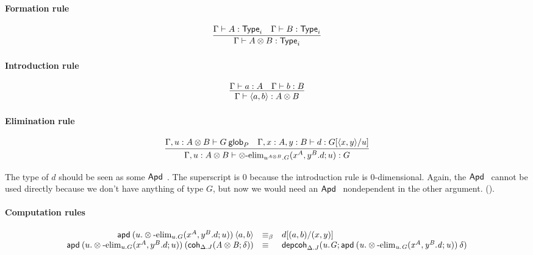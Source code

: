 \paragraph{Formation rule}

\begin{small}
  \[
  \infer{\wftype\Gamma{A\otimes B}} {\wftype\Gamma{A} & \wftype\Gamma{B}}
  \]
\end{small}

\paragraph{Introduction rule}

\begin{small}
  \[
  \infer{\ofglob{\Gamma}{\langle a, b\rangle}{A\otimes B}}
  {\ofglob{\Gamma}{a}{A}
    & \ofglob{\Gamma}{b}{B}}
  \]
\end{small}

\paragraph{Elimination rule}

\begin{small}
  \[
  \infer{\ofglob{\Gamma,u:A\otimes B}{\otimes\text{-elim}_{u^{A\otimes B}.G}
      {(x^A,y^B.d;u)}}{G}}
  {\wfglob{\Gamma,u:A\otimes B}{G}{m}{P}
    & \ofglob{\Gamma,x:A,y:B}{d}{G[\langle x,y\rangle/u]}}
  \]
\end{small}

The type of $d$ should be seen as some $\mathsf{Apd} \: {} \: {}$. The superscript is
$0$ because the introduction rule is $0$-dimensional. Again, the
$\mathsf{Apd} \: {} \: {}$ cannot be used directly because we don’t have anything of
type $G$, but now we would need an $\mathsf{Apd} \: {} \: {}$ nondependent in the other
argument. ().

\paragraph{Computation rules}

\begin{small}
  \[
  \begin{array}{rll}
    \mathsf{apd} \: {(u.\otimes\text{-elim}_{u.G}
      {(x^A,y^B.d;u)})} \: {\langle a,b\rangle} & \equiv_\beta & d[(a,b)/(x,y)] \\
    \mathsf{apd} \: {(u.\otimes\text{-elim}_{u.G}
      {(x^A,y^B.d;u)})} \: {(\mathsf{coh}_{\Delta.J} \mathit{(A\otimes B;\delta)})} & \equiv &
    \mathsf{depcoh}_{\Delta.J} \mathit{(u.G;\mathsf{apd} \: {(u.\otimes\text{-elim}_{u.G}
      {(x^A,y^B.d;u)})} \: {\delta})}
  \end{array}
  \]
\end{small}

